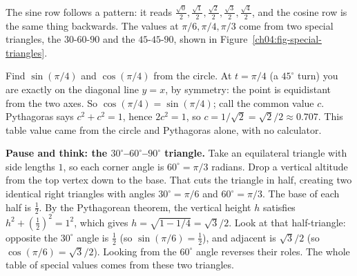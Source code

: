 The sine row follows a pattern: it reads $\tfrac{\sqrt0}{2}, \tfrac{\sqrt1}{2}, \tfrac{\sqrt2}{2}, \tfrac{\sqrt3}{2}, \tfrac{\sqrt4}{2}$, and the cosine row is the same thing backwards. The values at $\pi/6, \pi/4, \pi/3$ come from two special triangles, the $30$-$60$-$90$ and the $45$-$45$-$90$, shown in Figure~\ref{ch04:fig-special-triangles}.

\begin{labbox}
Find $\sin(\pi/4)$ and $\cos(\pi/4)$ from the circle. At $t = \pi/4$ (a $45^\circ$ turn) you are exactly on the diagonal line $y = x$, by symmetry: the point is equidistant from the two axes. So $\cos(\pi/4) = \sin(\pi/4)$; call the common value $c$. Pythagoras says $c^2 + c^2 = 1$, hence $2c^2 = 1$, so $c = 1/\sqrt2 = \sqrt2/2 \approx 0.707$. This table value came from the circle and Pythagoras alone, with no calculator.
\end{labbox}

\begin{recoverybox}
\textbf{Pause and think: the $30^\circ$--$60^\circ$--$90^\circ$ triangle.}
Take an equilateral triangle with side lengths $1$, so each corner angle is $60^\circ = \pi/3$ radians. Drop a vertical altitude from the top vertex down to the base. That cuts the triangle in half, creating two identical right triangles with angles $30^\circ = \pi/6$ and $60^\circ = \pi/3$. The base of each half is $\tfrac12$. By the Pythagorean theorem, the vertical height $h$ satisfies $h^2 + (\tfrac12)^2 = 1^2$, which gives $h = \sqrt{1 - 1/4} = \sqrt3/2$. Look at that half-triangle: opposite the $30^\circ$ angle is $\tfrac12$ (so $\sin(\pi/6) = \tfrac12$), and adjacent is $\sqrt3/2$ (so $\cos(\pi/6) = \sqrt3/2$). Looking from the $60^\circ$ angle reverses their roles. The whole table of special values comes from these two triangles.
\end{recoverybox}

